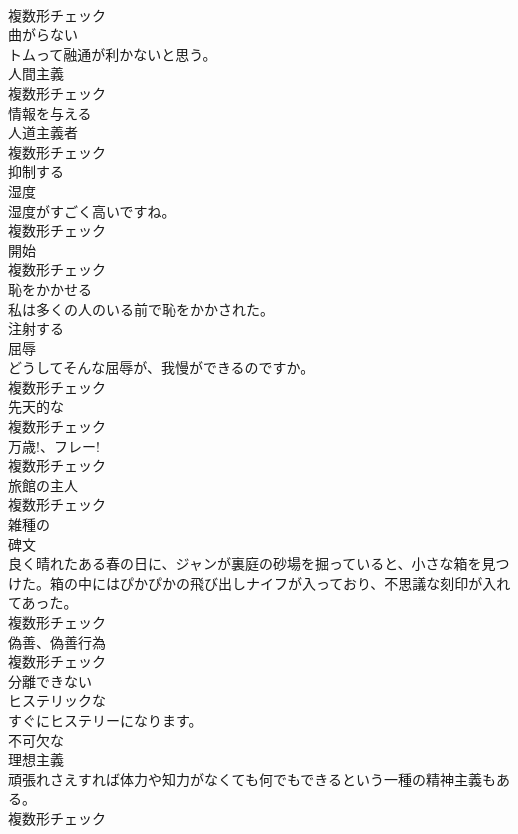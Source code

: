 \documentclass[8pt]{extreport}
\begin{document}
\begin{CJK}{UTF8}{min}
\\	複数形チェック
\\	[形容詞]	曲がらない	
\\	トムって融通が利かないと思う。	
\\	[名詞]	人間主義	
\\	複数形チェック
\\	[形容詞]	情報を与える	
\\	[名詞]	人道主義者	
\\	複数形チェック
\\	[動詞]	抑制する	
\\	[名詞]	湿度	
\\	湿度がすごく高いですね。	
\\	複数形チェック
\\	[名詞]	開始	
\\	複数形チェック
\\	[動詞]	恥をかかせる	
\\	私は多くの人のいる前で恥をかかされた。	
\\	[動詞]	注射する	
\\	[名詞]	屈辱	
\\	どうしてそんな屈辱が、我慢ができるのですか。	
\\	複数形チェック
\\	[名詞]	先天的な	
\\	複数形チェック
\\	[名詞]	万歳!、フレー!	
\\	複数形チェック
\\	[名詞]	旅館の主人	
\\	複数形チェック
\\	[形容詞]	雑種の	
\\	[名詞]	碑文	
\\	良く晴れたある春の日に、ジャンが裏庭の砂場を掘っていると、小さな箱を見つけた。箱の中にはぴかぴかの飛び出しナイフが入っており、不思議な刻印が入れてあった。	
\\	複数形チェック
\\	[名詞]	偽善、偽善行為	
\\	複数形チェック
\\	[形容詞]	分離できない	
\\	[形容詞]	ヒステリックな	
\\	すぐにヒステリーになります。	
\\	[形容詞]	不可欠な	
\\	[名詞]	理想主義	
\\	頑張れさえすれば体力や知力がなくても何でもできるという一種の精神主義もある。	
\\	複数形チェック

\end{CJK}
\end{document}
